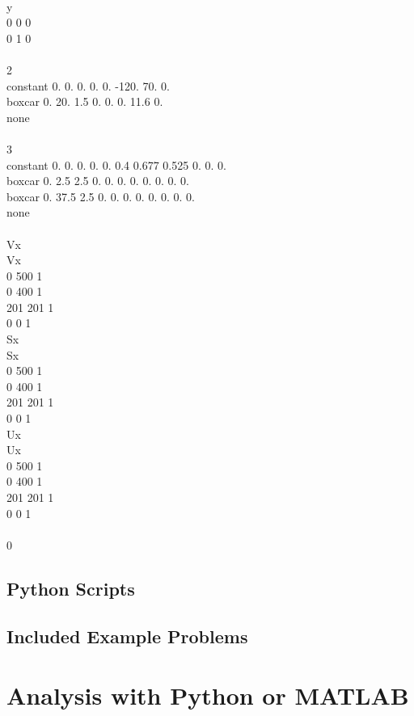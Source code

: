\documentclass[12pt]{article}   	%
\begin{document}
{\vspace{0.25em}
 \\
y \\
0 0 0 \\
0 1 0 \\

\vspace{0.25em}
 \\
2 \\
constant 0. 0. 0. 0. 0. -120. 70. 0. \\
boxcar 0. 20. 1.5 0. 0. 0. 11.6 0. \\
none \\

\vspace{0.25em}
 \\
3 \\
constant 0. 0. 0. 0. 0. 0.4 0.677 0.525 0. 0. 0. \\
boxcar 0. 2.5 2.5 0. 0. 0. 0. 0. 0. 0. 0. \\
boxcar 0. 37.5 2.5 0. 0. 0. 0. 0. 0. 0. 0. \\
none \\

\vspace{0.25em}
 \\
Vx \\
Vx \\
0 500 1 \\
0 400 1 \\
201 201 1 \\
0 0 1 \\
Sx \\
Sx \\
0 500 1 \\
0 400 1 \\
201 201 1 \\
0 0 1 \\
Ux \\
Ux \\
0 500 1 \\
0 400 1 \\
201 201 1 \\
0 0 1 \\

\vspace{0.25em}
 \\
0}



\subsection{Python Scripts}

\subsection{Included Example Problems}

\section{Analysis with Python or MATLAB}
\end{document}
